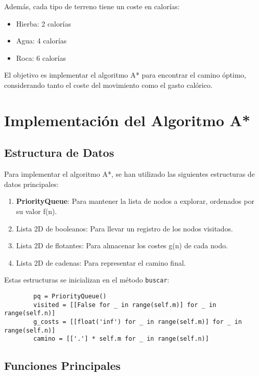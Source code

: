 \documentclass[a4paper,12pt]{article}
\begin{document}
	Además, cada tipo de terreno tiene un coste en calorías:
	\begin{itemize}
		\item Hierba: 2 calorías
		\item Agua: 4 calorías
		\item Roca: 6 calorías
	\end{itemize}
	
	El objetivo es implementar el algoritmo A* para encontrar el camino óptimo, considerando tanto el coste del movimiento como el gasto calórico.
	
	\section{Implementación del Algoritmo A*}
	
	\subsection{Estructura de Datos}
	Para implementar el algoritmo A*, se han utilizado las siguientes estructuras de datos principales:
	\begin{enumerate}
		\item \textbf{PriorityQueue}: Para mantener la lista de nodos a explorar, ordenados por su valor f(n).
		\item Lista 2D de booleanos: Para llevar un registro de los nodos visitados.
		\item Lista 2D de flotantes: Para almacenar los costes g(n) de cada nodo.
		\item Lista 2D de cadenas: Para representar el camino final.
	\end{enumerate}
	
	Estas estructuras se inicializan en el método \texttt{buscar}:
	
	\begin{verbatim}
		pq = PriorityQueue()
		visited = [[False for _ in range(self.m)] for _ in range(self.n)]
		g_costs = [[float('inf') for _ in range(self.m)] for _ in range(self.n)]
		camino = [['.'] * self.m for _ in range(self.n)]
	\end{verbatim}
	
	\subsection{Funciones Principales}
	
\end{document}
